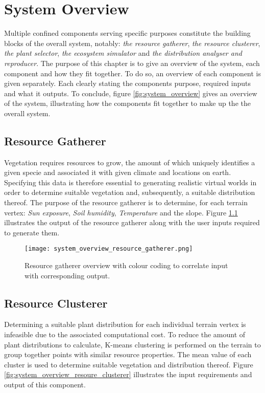 \chapter{System Overview}

Multiple confined components serving specific purposes constitute the building blocks of the overall system, notably: \textit{the resource gatherer}, \textit{the resource clusterer}, \textit{the plant selector}, \textit{the ecosystem simulator} and \textit{the distribution analyser and reproducer}. The purpose of this chapter is to give an overview of the system, each component and how they fit together. To do so, an overview of each component is given separately. Each clearly stating the components purpose, required inputs and what it outputs. To conclude, figure \ref{fig:system_overview} gives an overview of the system, illustrating how the components fit together to make up the the overall system. \\

\section{Resource Gatherer}

Vegetation requires resources to grow, the amount of which uniquely identifies a given specie and associated it with given climate and locations on earth. Specifying this data is therefore essential to generating realistic virtual worlds in order to determine suitable vegetation and, subsequently, a suitable distribution thereof. The purpose of the resource gatherer is to determine, for each terrain vertex: \textit{Sun exposure}, \textit{Soil humidity}, \textit{Temperature} and the slope. Figure \ref{fig:system_overview_resource_gatherer} illustrates the output of the resource gatherer along with the user inputs required to generate them.

\begin{figure}
\center
	\texttt{[image: system\_overview\_resource\_gatherer.png]}
	\caption{ Resource gatherer overview with colour coding to correlate input with corresponding output.}	
	\label{fig:system_overview_resource_gatherer}
\end{figure}

\section{Resource Clusterer}

Determining a suitable plant distribution for each individual terrain vertex is infeasible due to the associated computational cost. To reduce the amount of plant distributions to calculate, K-means clustering is performed on the terrain to group together points with similar resource properties. The mean value of each cluster is used to determine suitable vegetation and distribution thereof. Figure \ref{fig:system_overview_resoure_clusterer} illustrates the input requirements and output of this component.


